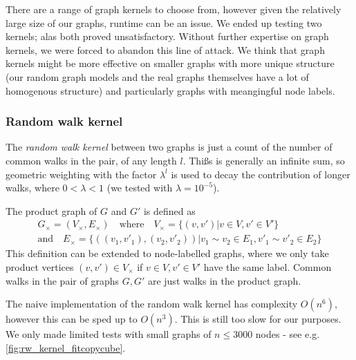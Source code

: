 




There are a range of graph kernels to choose from, however given the relatively large size of our graphs, runtime can be an issue. We ended up testing two kernels; alas both proved unsatisfactory. Without further expertise on graph kernels, we were forced to abandon this line of attack. We think that graph kernels might be more effective on smaller graphs with more unique structure (our random graph models and the real graphs themselves have a lot of homogenous structure) and particularly graphs with meangingful node labels.

\subsubsection{Random walk kernel}
The \textit{random walk kernel} between two graphs is just a count of the number of common walks in the pair,  of any length $l$. Thißs is generally an infinite sum, so geometric weighting with the factor $\lambda^l$ is used to decay the contribution of longer walks, where $0 < \lambda < 1$ (we tested with $\lambda=10^{-5}$).

The product graph of $G$ and  $G'$ is defined as 
\begin{align}
  G_\times = (V_\times, E_\times) \quad \text{where} \quad V_\times = \{(v, v') | v \in V, v' \in V'\}\\
  \text{and} \quad E_\times = \{((v_1, v'_1), (v_2, v'_2)) | v_1 \sim v_2 \in E_1, v'_1 \sim v'_2 \in E_2\}
\end{align}
This definition can be extended to node-labelled graphs, where we only take product vertices $(v, v') \in V_\times$ if $v \in V, v' \in V'$ have the same label. Common walks in the pair of graphs $G,G'$ are just walks in the product graph.

The naive implementation of the random walk kernel has complexity $O(n^6)$, however this can be sped up to $O(n^3)$. This is still too slow for our purposes. We only made limited tests with small graphs of $n \leq 3000$ nodes - see e.g. \cref{fig:rw_kernel_fitcopycube}.

